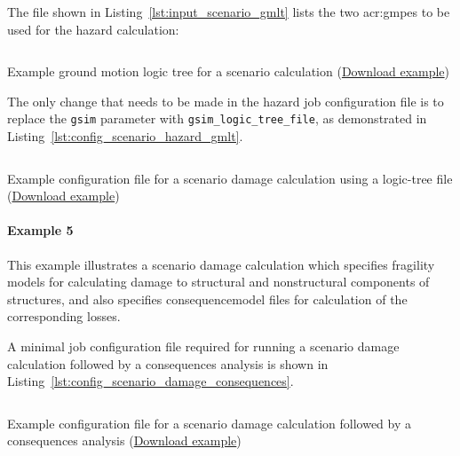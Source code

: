 The file shown in Listing~\ref{lst:input_scenario_gmlt} lists the two
\glspl{acr:gmpe} to be used for the hazard calculation:

\begin{listing}[htbp]
  \inputminted[firstline=1,firstnumber=1,fontsize=\footnotesize,frame=single,linenos,bgcolor=lightgray,label=gsim\_logic\_tree.xml]{xml}{oqum/risk/verbatim/input_scenario_gmlt.xml}
  \caption{Example ground motion logic tree for a scenario calculation (\href{https://raw.githubusercontent.com/GEMScienceTools/oq-engine-docs/master/oqum/risk/verbatim/input_scenario_gmlt.xml}{Download example})}
  \label{lst:input_scenario_gmlt}
\end{listing}

The only change that needs to be made in the hazard job configuration file is
to replace the \Verb+gsim+ parameter with \Verb+gsim_logic_tree_file+, as
demonstrated in Listing~\ref{lst:config_scenario_hazard_gmlt}.

\begin{listing}[htbp]
  \inputminted[firstline=1,firstnumber=1,fontsize=\footnotesize,frame=single,linenos,bgcolor=lightgray,label=job\_hazard.ini]{ini}{oqum/risk/verbatim/config_scenario_hazard_gmlt.ini}
  \caption{Example configuration file for a scenario damage calculation using a logic-tree file (\href{https://raw.githubusercontent.com/GEMScienceTools/oq-engine-docs/master/oqum/risk/verbatim/config_scenario_hazard_gmlt.xml}{Download example})}
  \label{lst:config_scenario_hazard_gmlt}
\end{listing}


\paragraph{Example 5}

This example illustrates a scenario damage calculation which specifies
fragility models for calculating damage to structural and nonstructural
components of structures, and also specifies \gls{consequencemodel} files for
calculation of the corresponding losses.

A minimal job configuration file required for running a scenario damage
calculation followed by a consequences analysis is shown in
Listing~\ref{lst:config_scenario_damage_consequences}.

\begin{listing}[htbp]
  \inputminted[firstline=1,firstnumber=1,fontsize=\footnotesize,frame=single,linenos,bgcolor=lightgray,label=job.ini]{ini}{oqum/risk/verbatim/config_scenario_damage_consequences.ini}
  \caption{Example configuration file for a scenario damage calculation followed by a consequences analysis (\href{https://raw.githubusercontent.com/GEMScienceTools/oq-engine-docs/master/oqum/risk/verbatim/config_scenario_damage_consequences.xml}{Download example})}
  \label{lst:config_scenario_damage_consequences}
\end{listing}


